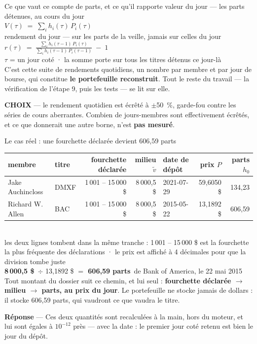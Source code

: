 \documentclass[11pt,aspectratio=169]{beamer}
\newcommand{\kpi}[3]{{\large\textbf{\textcolor{#1}{#2}}}~{\footnotesize #3}}
\newcommand{\defl}[1]{{\scriptsize\color{black!55}#1}}
\newcommand{\choixbox}[1]{%
  \colorbox{alertred!8}{\parbox{\dimexpr\linewidth-8pt}{\scriptsize
    \textbf{\textcolor{alertred}{CHOIX}}\; --- #1}}}
\newcommand{\repband}[1]{%
  \colorbox{okgreen!12}{\parbox{\dimexpr\textwidth-10pt}{\scriptsize
    \textbf{\textcolor{okgreen}{Réponse}}\; --- #1}}}
\newcommand{\bmaths}[2]{%
  {\scriptsize\color{black!55}#1}\\[0.2mm]
  {\small$\displaystyle #2$}\\[2mm]}
\begin{document}
\begin{frame}{Ce que vaut ce compte de parts, et ce qu'il rapporte}
  \centering
  \bmaths{valeur du jour — les parts détenues, au cours du jour}
         {V(\tau) \;=\; \textstyle\sum_i h_i(\tau)\,P_i(\tau)}
  \bmaths{rendement du jour — sur les parts de la veille, jamais sur celles du jour}
         {r(\tau) \;=\; \frac{\sum_i h_i(\tau-1)\,P_i(\tau)}{\sum_i h_i(\tau-1)\,P_i(\tau-1)} \;-\; 1}
  \defl{$\tau$ = un jour coté · la somme porte sur tous les titres détenus ce jour-là}\\[3mm]
  {\footnotesize C'est cette suite de rendements quotidiens, un nombre par membre et par jour de
  bourse, qui constitue \textbf{le portefeuille reconstruit}. Tout le reste du travail --- la
  vérification de l'étape 9, puis les tests --- se lit sur elle.}\\[3.5mm]
  \raggedright
  \choixbox{le rendement quotidien est écrêté à $\pm$50~\%, garde-fou contre les séries de cours
  aberrantes. Combien de jours-membres sont effectivement écrêtés, et ce que donnerait une autre
  borne, n'est \textbf{pas mesuré}.}
\end{frame}

\begin{frame}{Le cas réel : une fourchette déclarée devient 606,59 parts}
  \centering\small
  \begin{tabular}{llrrlrr}
    \toprule
    membre & titre & fourchette déclarée & milieu $\tilde v$ & date de dépôt & prix $P$ & parts $h_0$\\
    \midrule
    Jake Auchincloss & DMXF & 1\,001 -- 15\,000 \$ & 8\,000,5 \$ & 2021-07-29 & 59,6050 \$ & 134,23\\
    Richard W. Allen & BAC  & 1\,001 -- 15\,000 \$ & 8\,000,5 \$ & 2015-05-22 & 13,1892 \$ & 606,59\\
    \bottomrule
  \end{tabular}\\[3mm]
  \defl{les deux lignes tombent dans la même tranche : 1\,001 -- 15\,000 \$ est la fourchette la plus
  fréquente des déclarations · le prix est affiché à 4 décimales pour que la division tombe juste}\\[5mm]
  \kpi{okgreen}{8\,000,5 \$}{$\div$ 13,1892 \$} \kpi{okgreen}{$=$ 606,59 parts}{de Bank of America, le 22 mai 2015}\\[5mm]
  {\footnotesize Tout montant du dossier suit ce chemin, et lui seul : \textbf{fourchette déclarée
  $\rightarrow$ milieu $\rightarrow$ parts, au prix du jour}. Le portefeuille ne stocke jamais de
  dollars : il stocke 606,59 parts, qui vaudront ce que vaudra le titre.}\\[5mm]
  \repband{Ces deux quantités sont recalculées à la main, hors du moteur, et lui sont égales à
  $10^{-12}$ près --- avec la date : le premier jour coté retenu est bien le jour du dépôt.}
\end{frame}
\end{document}
